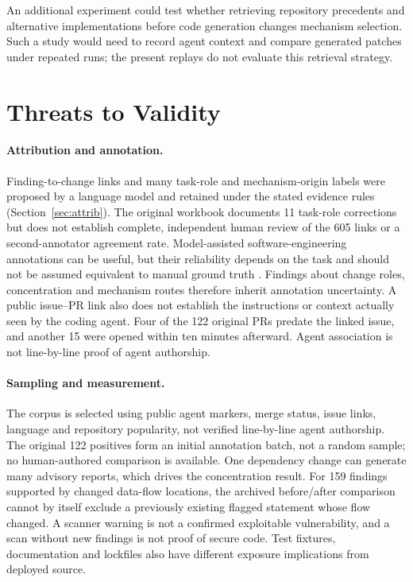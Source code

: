 \documentclass[acmsmall,screen,nonacm]{acmart}
\begin{document}
An additional experiment could test whether retrieving repository precedents and alternative implementations before code generation changes mechanism selection. Such a study would need to record agent context and compare generated patches under repeated runs; the present replays do not evaluate this retrieval strategy.

\section{Threats to Validity}\label{sec:threats}

\paragraph{Attribution and annotation.} Finding-to-change links and many task-role and mechanism-origin labels were proposed by a language model and retained under the stated evidence rules (Section~\ref{sec:attrib}). The original workbook documents 11 task-role corrections but does not establish complete, independent human review of the 605 links or a second-annotator agreement rate. Model-assisted software-engineering annotations can be useful, but their reliability depends on the task and should not be assumed equivalent to manual ground truth \cite{b40}. Findings about change roles, concentration and mechanism routes therefore inherit annotation uncertainty. A public issue--PR link also does not establish the instructions or context actually seen by the coding agent. Four of the 122 original PRs predate the linked issue, and another 15 were opened within ten minutes afterward. Agent association is not line-by-line proof of agent authorship.

\paragraph{Sampling and measurement.} The corpus is selected using public agent markers, merge status, issue links, language and repository popularity, not verified line-by-line agent authorship. The original 122 positives form an initial annotation batch, not a random sample; no human-authored comparison is available. One dependency change can generate many advisory reports, which drives the concentration result. For 159 findings supported by changed data-flow locations, the archived before/after comparison cannot by itself exclude a previously existing flagged statement whose flow changed. A scanner warning is not a confirmed exploitable vulnerability, and a scan without new findings is not proof of secure code. Test fixtures, documentation and lockfiles also have different exposure implications from deployed source.
\end{document}
